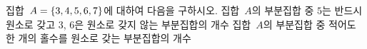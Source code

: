 집합~$A=\{3{,}\mkern3mu\mathopen{}4{,}\mkern3mu\mathopen{}5{,}\mkern3mu\mathopen{}6{,}\mkern3mu\mathopen{}7\}$에 대하여 다음을 구하시오.
 집합~$A$의 부분집합 중 $5$는 반드시 원소로 갖고 $3$, $6$은 원소로 갖지 않는 부분집합의 개수
 집합~$A$의 부분집합 중 적어도 한 개의 홀수를 원소로 갖는 부분집합의 개수
